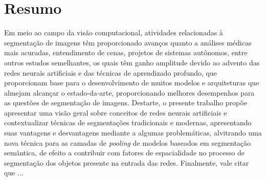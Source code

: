 \section*{Resumo}
\thispagestyle{empty}
\makeatletter
\newcommand*{\rom}[1]{\expandafter\@slowromancap\romannumeral #1@}
\makeatother
Em meio ao campo da visão computacional, atividades relacionadas à segmentação de imagens têm proporcionado avanços quanto a análises médicas mais acuradas, entendimento de cenas, projetos de sistemas autônomos, entre outros estudos semelhantes, os quais têm ganho amplitude devido ao advento das redes neurais artificiais e das técnicas de aprendizado profundo, que proporcionam base para o desenvolvimento de muitos modelos e arquiteturas que almejam alcançar o estado-da-arte, proporcionando melhores desempenhos para as questões de segmentação de imagens.
Destarte, o presente trabalho propõe apresentar uma visão geral sobre conceitos de redes neurais artificiais e contextualizar técnicas de segmentações tradicionais e modernas, apresentando suas vantagens e desvantagens mediante a algumas problemáticas, alvitrando uma nova técnica para as camadas de \textit{pooling} de modelos baseados em segmentação semântica, de efeito a contribuir com fatores de espacialidade no processo de segmentação dos objetos presente na entrada das redes.
Finalmente, vale citar que ...